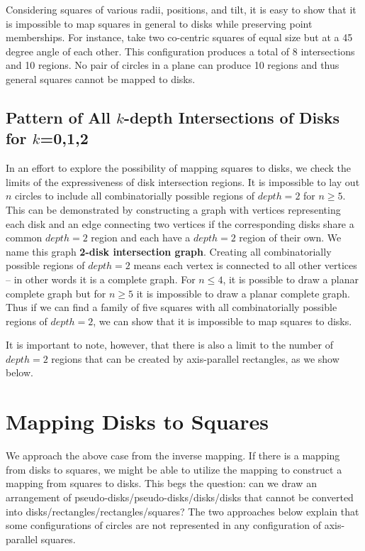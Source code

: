\documentclass{NSF}
\begin{document}
Considering squares of various radii, positions, and tilt, it is easy to show that it is impossible to map squares in general to disks while preserving point memberships. For instance, take two co-centric squares of equal size but at a 45 degree angle of each other. This configuration produces a total of 8 intersections and 10 regions. No pair of circles in a plane can produce 10 regions and thus general squares cannot be mapped to disks.

\subsection{Pattern of All $k$-depth Intersections of Disks for $k$=0,1,2 }
In an effort to explore the possibility of mapping squares to disks, we check the limits of the expressiveness of disk intersection regions. It is impossible to lay out $n$ circles to include all combinatorially possible regions of $depth=2$ for $n \geq 5$. This can be demonstrated by constructing a graph with vertices representing each disk and an edge connecting two vertices if the corresponding disks share a common $depth=2$ region and each have a $depth=2$ region of their own. We name this graph \textbf{2-disk intersection graph}. Creating all combinatorially possible regions of $depth=2$ means each vertex is connected to all other vertices -- in other words it is a complete graph. For $n \leq 4$, it is possible to draw a planar complete graph but for $n \geq 5$ it is impossible to draw a planar complete graph. Thus if we can find a family of five squares with all combinatorially possible regions of $depth=2$, we can show that it is impossible to map squares to disks.

It is important to note, however, that there is also a limit to the number of $depth=2$ regions that can be created by axis-parallel rectangles, as we show below. 

\section{Mapping Disks to Squares}
We approach the above case from the inverse mapping. If there is a mapping from disks to squares, we might be able to utilize the mapping to construct a mapping from squares to disks. This begs the question: can we draw an arrangement of pseudo-disks/pseudo-disks/disks/disks that cannot be converted into disks/rectangles/rectangles/squares? The two approaches below explain that some configurations of circles are not represented in any configuration of axis-parallel squares.
\end{document}
